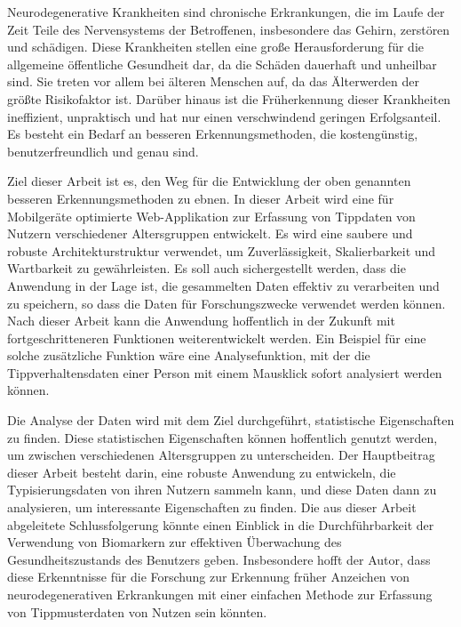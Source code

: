 Neurodegenerative Krankheiten sind chronische Erkrankungen, die im Laufe der Zeit Teile des Nervensystems der Betroffenen, insbesondere das Gehirn, zerstören und schädigen. 
Diese Krankheiten stellen eine große Herausforderung für die allgemeine öffentliche Gesundheit dar, da die Schäden dauerhaft und unheilbar sind. 
Sie treten vor allem bei älteren Menschen auf, da das Älterwerden der größte Risikofaktor ist. 
Darüber hinaus ist die Früherkennung dieser Krankheiten ineffizient, unpraktisch und hat nur einen verschwindend geringen Erfolgsanteil. 
Es besteht ein Bedarf an besseren Erkennungsmethoden, die kostengünstig, benutzerfreundlich und genau sind.

Ziel dieser Arbeit ist es, den Weg für die Entwicklung der oben genannten besseren Erkennungsmethoden zu ebnen.
In dieser Arbeit wird eine für Mobilgeräte optimierte Web-Applikation zur Erfassung von Tippdaten von Nutzern verschiedener Altersgruppen entwickelt. 
Es wird eine saubere und robuste Architekturstruktur verwendet, um Zuverlässigkeit, Skalierbarkeit und Wartbarkeit zu gewährleisten. 
Es soll auch sichergestellt werden, dass die Anwendung in der Lage ist, die gesammelten Daten effektiv zu verarbeiten und zu speichern, so dass die Daten für Forschungszwecke verwendet werden können.
Nach dieser Arbeit kann die Anwendung hoffentlich in der Zukunft mit fortgeschritteneren Funktionen weiterentwickelt werden. 
Ein Beispiel für eine solche zusätzliche Funktion wäre eine Analysefunktion, mit der die Tippverhaltensdaten einer Person mit einem Mausklick sofort analysiert werden können.

Die Analyse der Daten wird mit dem Ziel durchgeführt, statistische Eigenschaften zu finden.
Diese statistischen Eigenschaften können hoffentlich genutzt werden, um zwischen verschiedenen Altersgruppen zu unterscheiden.
Der Hauptbeitrag dieser Arbeit besteht darin, eine robuste Anwendung zu entwickeln, die Typisierungsdaten von ihren Nutzern sammeln kann, und diese Daten dann zu analysieren, um interessante Eigenschaften zu finden. 
Die aus dieser Arbeit abgeleitete Schlussfolgerung könnte einen Einblick in die Durchführbarkeit der Verwendung von Biomarkern zur effektiven Überwachung des Gesundheitszustands des Benutzers geben.
Insbesondere hofft der Autor, dass diese Erkenntnisse für die Forschung zur Erkennung früher Anzeichen von neurodegenerativen Erkrankungen mit einer einfachen Methode zur Erfassung von Tippmusterdaten von Nutzen sein könnten.